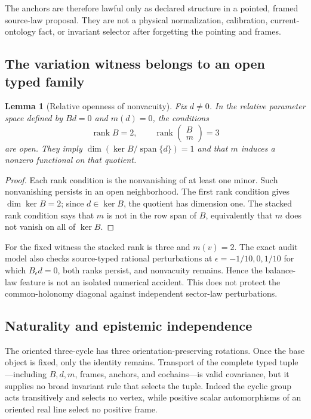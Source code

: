 \documentclass[11pt]{article}
\newtheorem{lemma}{Lemma}
\begin{document}
The anchors are therefore lawful only as declared structure in a pointed,
framed source-law proposal.  They are not a physical normalization,
calibration, current-ontology fact, or invariant selector after forgetting the
pointing and frames.

\subsection{The variation witness belongs to an open typed family}

\begin{lemma}[Relative openness of nonvacuity]
Fix $d\ne0$.  In the relative parameter space defined by $Bd=0$ and $m(d)=0$,
the conditions
\[
 \operatorname{rank}B=2,\qquad
 \operatorname{rank}\!\begin{pmatrix}B\\m\end{pmatrix}=3
\]
are open.  They imply
$\dim(\ker B/\operatorname{span}\{d\})=1$ and that $m$ induces a nonzero
functional on that quotient.
\end{lemma}

\begin{proof}
Each rank condition is the nonvanishing of at least one minor.  Such
nonvanishing persists in an open neighborhood.  The first rank condition gives
$\dim\ker B=2$; since $d\in\ker B$, the quotient has dimension one.  The stacked
rank condition says that $m$ is not in the row span of $B$, equivalently that
$m$ does not vanish on all of $\ker B$.
\end{proof}

For the fixed witness the stacked rank is three and $m(v)=2$.  The exact audit
model also checks source-typed rational perturbations at
$\epsilon=-1/10,0,1/10$ for which $B_\epsilon d=0$, both ranks persist, and
nonvacuity remains.  Hence the balance-law feature is not an isolated numerical
accident.  This does not protect the common-holonomy diagonal against
independent sector-law perturbations.

\subsection{Naturality and epistemic independence}

The oriented three-cycle has three orientation-preserving rotations.  Once the
base object is fixed, only the identity remains.  Transport of the complete
typed tuple---including $B,d,m$, frames, anchors, and cochains---is valid
covariance, but it supplies no broad invariant rule that selects the tuple.
Indeed the cyclic group acts transitively and selects no vertex, while positive
scalar automorphisms of an oriented real line select no positive frame.
\end{document}
